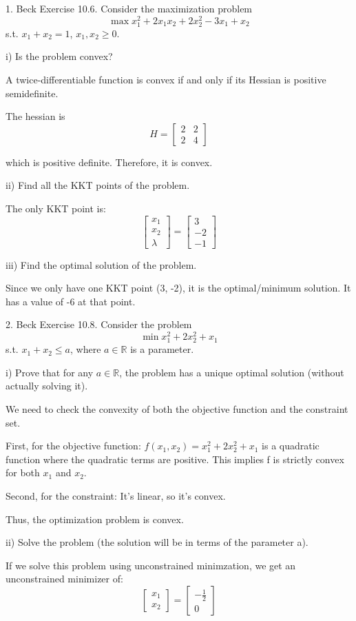 \documentclass{article}
\newcommand{\RR}{\mathbb{R}}
\begin{document}
1. Beck Exercise 10.6. Consider the maximization problem
\[\max x_1^2 + 2 x_1 x_2 + 2 x_2^2 - 3 x_1 + x_2\]
s.t. $x_1 + x_2 = 1$,
$x_1, x_2 \geq 0$.

i) Is the problem convex?

A twice-differentiable function is convex if and only if its Hessian is positive semidefinite.

The hessian is
\[H = \begin{bmatrix}
    2 & 2 \\
    2 & 4
\end{bmatrix}\]

which is positive definite. Therefore, it is convex.

ii) Find all the KKT points of the problem.

The only KKT point is:
\[\begin{bmatrix}
    x_1 \\
    x_2 \\
    \lambda
\end{bmatrix} = \begin{bmatrix}
    3 \\
    -2 \\
    -1
\end{bmatrix}\]

iii) Find the optimal solution of the problem.

Since we only have one KKT point (3, -2), it is the optimal/minimum solution.
It has a value of -6 at that point.


2. Beck Exercise 10.8. Consider the problem
\[\min x_1^2 + 2 x_2^2 + x_1\]
s.t. $x_1 + x_2 \leq a$,
where $a \in \RR$ is a parameter.

i) Prove that for any $a \in \RR$, the problem has a unique optimal solution (without actually solving it).

We need to check the convexity of both the objective function and the constraint set.

First, for the objective function:
$f(x_1, x_2) = x_1^2 + 2x_2^2 + x_1$ is a quadratic function where the quadratic terms are positive.
This implies f is strictly convex for both $x_1$ and $x_2$.

Second, for the constraint:
It's linear, so it's convex.

Thus, the optimization problem is convex.

ii) Solve the problem (the solution will be in terms of the parameter a).

If we solve this problem using unconstrained minimzation,
we get an unconstrained minimizer of:
\[\begin{bmatrix}
    x_1 \\
    x_2
\end{bmatrix} = \begin{bmatrix}
    -\frac{1}{2} \\
    0
\end{bmatrix}\]
\end{document}
